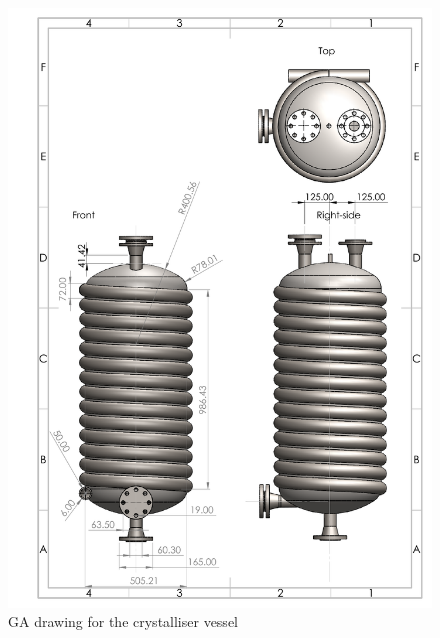 \newpage
\begin{figure}[h!]
    \centering
    \includegraphics[scale=0.8]{chapters/3-separation/figures/Crystalliser_GA.PDF}
    \caption{GA drawing for the crystalliser vessel}
    \label{fig:crystalliser GA}
\end{figure} 

\newpage